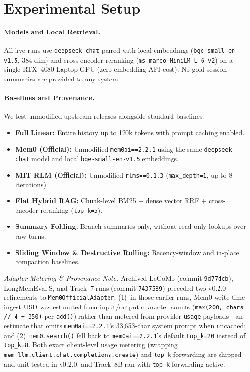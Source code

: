 \documentclass[10pt,twocolumn]{article}
\begin{document}
\section{Experimental Setup}

\paragraph{Models and Local Retrieval.}
All live runs use \texttt{deepseek-chat} \citep{deepseek2024v3} paired with local embeddings (\texttt{bge-small-en-v1.5}, 384-dim) and cross-encoder reranking (\texttt{ms-marco-MiniLM-L-6-v2}) on a single RTX~4080 Laptop GPU (zero embedding API cost). No gold session summaries are provided to any system.

\paragraph{Baselines and Provenance.}
We test unmodified upstream releases alongside standard baselines:
\begin{itemize}
  \item \textbf{Full Linear:} Entire history up to 120k tokens with prompt caching enabled.
  \item \textbf{Mem0 (Official):} Unmodified \texttt{mem0ai==2.2.1} using the same \texttt{deepseek-chat} model and local \texttt{bge-small-en-v1.5} embeddings.
  \item \textbf{MIT RLM (Official):} Unmodified \texttt{rlms==0.1.3} \citep{zhang2025rlm} (\texttt{max\_depth=1}, up to 8 iterations).
  \item \textbf{Flat Hybrid RAG:} Chunk-level BM25 + dense vector RRF + cross-encoder reranking (\texttt{top\_k=5}).
  \item \textbf{Summary Folding:} Branch summaries only, without read-only lookups over raw turns.
  \item \textbf{Sliding Window \& Destructive Rolling:} Recency-window and in-place compaction baselines.
\end{itemize}
\noindent\textit{Adapter Metering \& Provenance Note.} Archived LoCoMo (commit \texttt{9d77dcb}), LongMemEval-S, and Track~7 runs (commit \texttt{7437589}) preceded two v0.2.0 refinements to \texttt{Mem0OfficialAdapter}: (1)~in those earlier runs, Mem0 write-time ingest USD was estimated from input/output character counts (\texttt{max(200, chars // 4 + 350)} per \texttt{add()}) rather than metered from provider \texttt{usage} payloads—an estimate that omits \texttt{mem0ai==2.2.1}'s 33,653-char system prompt when uncached; and (2)~\texttt{mem0.search()} fell back to \texttt{mem0ai==2.2.1}'s default \texttt{top\_k=20} instead of \texttt{top\_k=8}. Both exact client-level usage metering (wrapping \texttt{mem.llm.client.chat.completions.create}) and \texttt{top\_k} forwarding are shipped and unit-tested in v0.2.0, and Track~8B ran with \texttt{top\_k} forwarding active.
\end{document}
